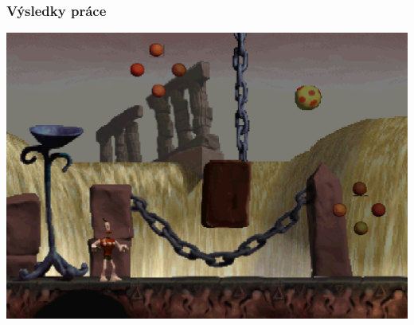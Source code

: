 \begin{frame}
  \frametitle{Výsledky práce}
  \includegraphics[width=1\textwidth]{img/skull-highres.png}
\end{frame}





